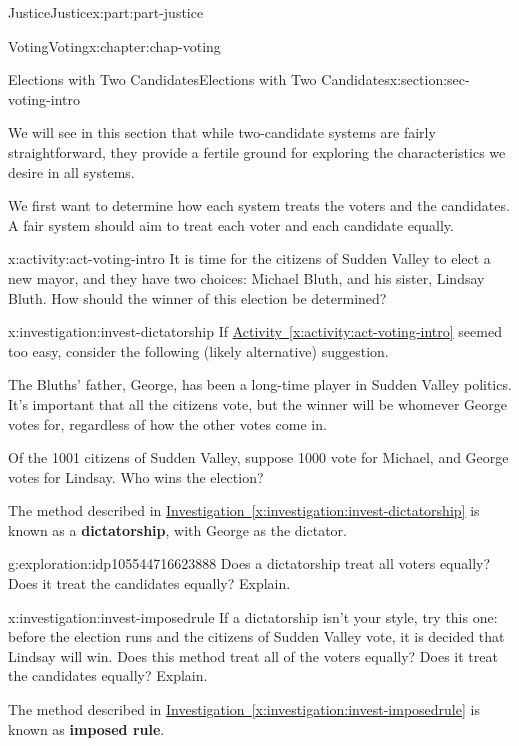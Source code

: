 \documentclass[oneside,10pt,]{book}
\newcommand{\xreffont}{\relax}
\newcommand{\terminology}[1]{\textbf{#1}}
\numberwithin{equation}{section}
\begin{document}
\begin{partptx}{Justice}{}{Justice}{}{}{x:part:part-justice}
\begin{chapterptx}{Voting}{}{Voting}{}{}{x:chapter:chap-voting}
\begin{sectionptx}{Elections with Two Candidates}{}{Elections with Two Candidates}{}{}{x:section:sec-voting-intro}
\begin{introduction}{}
\par
We will see in this section that while two-candidate systems are fairly straightforward, they provide a fertile ground for exploring the characteristics we desire in all systems.%
\par
We first want to determine how each system treats the voters and the candidates. A fair system should aim to treat each voter and each candidate equally.%
\end{introduction}%
\begin{activity}{}{x:activity:act-voting-intro}%
It is time for the citizens of Sudden Valley to elect a new mayor, and they have two choices: Michael Bluth, and his sister, Lindsay Bluth. How should the winner of this election be determined?%
\end{activity}%
\begin{investigation}{}{x:investigation:invest-dictatorship}%
If \hyperref[x:activity:act-voting-intro]{Activity~{\xreffont\ref{x:activity:act-voting-intro}}} seemed too easy, consider the following (likely alternative) suggestion.%
\par
The Bluths' father, George, has been a long-time player in Sudden Valley politics. It's important that all the citizens vote, but the winner will be whomever George votes for, regardless of how the other votes come in.%
\par
Of the 1001 citizens of Sudden Valley, suppose 1000 vote for Michael, and George votes for Lindsay. Who wins the election?%
\end{investigation}%
The method described in \hyperref[x:investigation:invest-dictatorship]{Investigation~{\xreffont\ref{x:investigation:invest-dictatorship}}} is known as a \terminology{dictatorship}, with George as the dictator.%
\begin{exploration}{}{g:exploration:idp105544716623888}%
Does a dictatorship treat all voters equally? Does it treat the candidates equally? Explain.%
\end{exploration}%
\begin{investigation}{}{x:investigation:invest-imposedrule}%
If a dictatorship isn't your style, try this one: before the election runs and the citizens of Sudden Valley vote, it is decided that Lindsay will win. Does this method treat all of the voters equally? Does it treat the candidates equally? Explain.%
\end{investigation}%
The method described in \hyperref[x:investigation:invest-imposedrule]{Investigation~{\xreffont\ref{x:investigation:invest-imposedrule}}} is known as \terminology{imposed rule}.%

\end{sectionptx}
\end{chapterptx}
\end{partptx}
\end{document}
